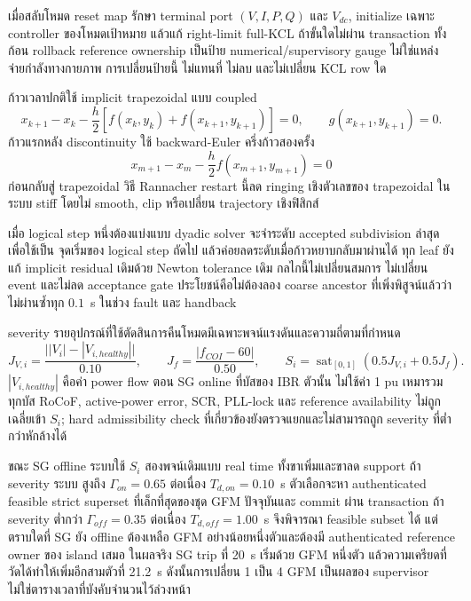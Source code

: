 \documentclass[12pt,a4paper]{article}
\begin{document}
เมื่อสลับโหมด reset map รักษา terminal port $(V,I,P,Q)$ และ $V_{dc}$, initialize เฉพาะ controller
ของโหมดเป้าหมาย แล้วแก้ right-limit full-KCL ถ้าขั้นใดไม่ผ่าน transaction ทั้งก้อน rollback
reference ownership เป็นป้าย numerical/supervisory gauge ไม่ใช่แหล่งจ่ายกำลังทางกายภาพ การเปลี่ยนป้ายนี้
ไม่แทนที่ ไม่ลบ และไม่เปลี่ยน KCL row ใด

ก้าวเวลาปกติใช้ implicit trapezoidal แบบ coupled
\begin{equation}
x_{k+1}-x_k-\frac{h}{2}[f(x_k,y_k)+f(x_{k+1},y_{k+1})]=0,\qquad
g(x_{k+1},y_{k+1})=0.
\end{equation}
ก้าวแรกหลัง discontinuity ใช้ backward-Euler ครึ่งก้าวสองครั้ง
\begin{equation}
x_{m+1}-x_m-\frac{h}{2}f(x_{m+1},y_{m+1})=0
\end{equation}
ก่อนกลับสู่ trapezoidal วิธี Rannacher restart นี้ลด ringing เชิงตัวเลขของ trapezoidal ในระบบ stiff
โดยไม่ smooth, clip หรือเปลี่ยน trajectory เชิงฟิสิกส์

เมื่อ logical step หนึ่งต้องแบ่งแบบ dyadic solver จะจำระดับ accepted subdivision ล่าสุดเพื่อใช้เป็น
จุดเริ่มของ logical step ถัดไป แล้วค่อยลดระดับเมื่อก้าวหยาบกลับมาผ่านได้ ทุก leaf ยังแก้ implicit residual
เดิมด้วย Newton tolerance เดิม กลไกนี้ไม่เปลี่ยนสมการ ไม่เปลี่ยน event และไม่ลด acceptance gate
ประโยชน์คือไม่ต้องลอง coarse ancestor ที่เพิ่งพิสูจน์แล้วว่าไม่ผ่านซ้ำทุก $0.1$~s ในช่วง fault และ handback

severity รายอุปกรณ์ที่ใช้ตัดสินการคืนโหมดมีเฉพาะพจน์แรงดันและความถี่ตามที่กำหนด
\begin{equation}
J_{V,i}=\frac{\bigl||V_i|-|V_{i,healthy}|\bigr|}{0.10},\qquad
J_f=\frac{|f_{COI}-60|}{0.50},\qquad
S_i=\operatorname{sat}_{[0,1]}\!\left(0.5J_{V,i}+0.5J_f\right).
\end{equation}
$|V_{i,healthy}|$ คือค่า power flow ตอน SG online ที่บัสของ IBR ตัวนั้น ไม่ใช้ค่า 1 pu เหมารวมทุกบัส
RoCoF, active-power error, SCR, PLL-lock และ reference availability ไม่ถูกเฉลี่ยเข้า $S_i$;
hard admissibility check ที่เกี่ยวข้องยังตรวจแยกและไม่สามารถถูก severity ที่ต่ำกว่าหักล้างได้

ขณะ SG offline ระบบใช้ $S_i$ สองพจน์เดิมแบบ real time ทั้งขาเพิ่มและขาลด support ถ้า severity ระบบ
สูงถึง $\Gamma_{on}=0.65$ ต่อเนื่อง $T_{d,on}=0.10$~s ตัวเลือกจะหา authenticated feasible strict
superset ที่เล็กที่สุดของชุด GFM ปัจจุบันและ commit ผ่าน transaction ถ้า severity ต่ำกว่า
$\Gamma_{off}=0.35$ ต่อเนื่อง $T_{d,off}=1.00$~s จึงพิจารณา feasible subset ได้ แต่ตราบใดที่ SG ยัง
offline ต้องเหลือ GFM อย่างน้อยหนึ่งตัวและต้องมี authenticated reference owner ของ island เสมอ
ในผลจริง SG trip ที่ 20~s เริ่มด้วย GFM หนึ่งตัว แล้วความเครียดที่วัดได้ทำให้เพิ่มอีกสามตัวที่ 21.2~s
ดังนั้นการเปลี่ยน 1 เป็น 4 GFM เป็นผลของ supervisor ไม่ใช่ตารางเวลาที่บังคับจำนวนไว้ล่วงหน้า
\end{document}
